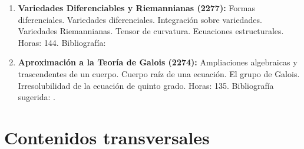 \documentclass[a4paper, 12pt]{article}
\begin{document}
\begin{description}
\begin{enumerate}
\item\textbf{ Variedades Diferenciables y Riemannianas  (2277):}
Formas diferenciales. Variedades diferenciales. Integración
sobre variedades. Variedades Riemannianas. Tensor de curvatura.  Ecuaciones estructurales.
 Horas: 144. Bibliografía: \cite{boothby2003introduction,do2012differential,spivak1988cálculo}

\item\textbf{ Aproximación a la Teoría de Galois (2274):} Ampliaciones algebraicas y trascendentes de un cuerpo.  Cuerpo raíz de una ecuación. El grupo de Galois. Irresolubilidad de la ecuación de quinto grado. Horas: 135. Bibliografía sugerida: \cite{herstein,artin}.
\end{enumerate}



\end{description}

\section{Contenidos transversales}
\end{document}

